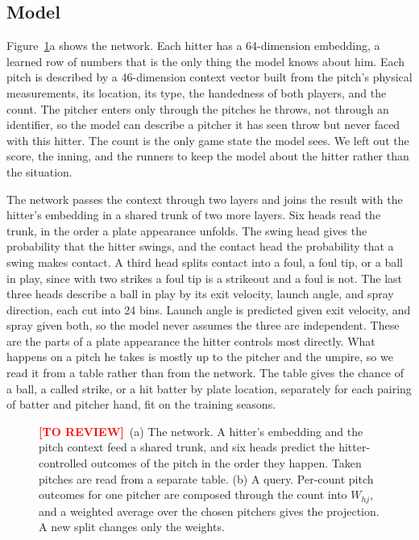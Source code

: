 \documentclass[11pt,letterpaper]{article}
\newcommand{\toreview}{\textcolor{red}{\textbf{[TO REVIEW]}}~}
\begin{document}
\subsection{Model}
\label{sec:model}

Figure~\ref{fig:arch}a shows the network. Each hitter has a 64-dimension embedding, a learned row of numbers that is the only thing the model knows about him. Each pitch is described by a 46-dimension context vector built from the pitch's physical measurements, its location, its type, the handedness of both players, and the count. The pitcher enters only through the pitches he throws, not through an identifier, so the model can describe a pitcher it has seen throw but never faced with this hitter. The count is the only game state the model sees. We left out the score, the inning, and the runners to keep the model about the hitter rather than the situation.

The network passes the context through two layers and joins the result with the hitter's embedding in a shared trunk of two more layers. Six heads read the trunk, in the order a plate appearance unfolds. The swing head gives the probability that the hitter swings, and the contact head the probability that a swing makes contact. A third head splits contact into a foul, a foul tip, or a ball in play, since with two strikes a foul tip is a strikeout and a foul is not. The last three heads describe a ball in play by its exit velocity, launch angle, and spray direction, each cut into 24 bins. Launch angle is predicted given exit velocity, and spray given both, so the model never assumes the three are independent. These are the parts of a plate appearance the hitter controls most directly. What happens on a pitch he takes is mostly up to the pitcher and the umpire, so we read it from a table rather than from the network. The table gives the chance of a ball, a called strike, or a hit batter by plate location, separately for each pairing of batter and pitcher hand, fit on the training seasons.

\begin{figure}[t]
\centering

\caption{\toreview (a) The network. A hitter's embedding and the pitch context feed a shared trunk, and six heads predict the hitter-controlled outcomes of the pitch in the order they happen. Taken pitches are read from a separate table. (b) A query. Per-count pitch outcomes for one pitcher are composed through the count into $W_{hj}$, and a weighted average over the chosen pitchers gives the projection. A new split changes only the weights.}
\label{fig:arch}
\end{figure}
\end{document}
